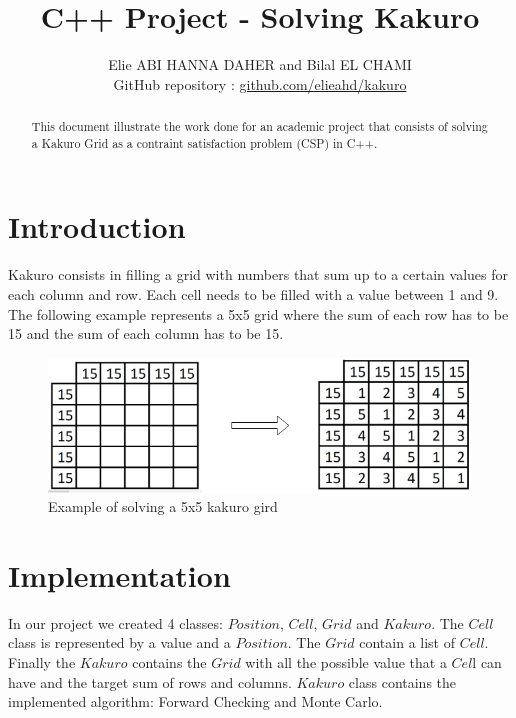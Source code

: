 \documentclass[journal, a4paper]{IEEEtran}
\begin{document}
\title{C++ Project - Solving Kakuro}
\author{
	Elie ABI HANNA DAHER and Bilal EL CHAMI \\ 
	GitHub repository : \href{https://github.com/elieahd/kakuro}{github.com/elieahd/kakuro}
}
\maketitle

\begin{abstract}
	This document illustrate the work done for an academic project that consists of solving a Kakuro Grid as a contraint satisfaction problem (CSP) in C++.
\end{abstract}

\section{Introduction}
 Kakuro consists in filling a grid with numbers that sum up to a certain values for each column and row. Each cell needs to be filled with a value between 1 and 9.\\
 The following example represents a 5x5 grid where the sum of each row has to be 15 and the sum of each column has to be 15.
\begin{figure}[h!]
    	 \begin{center}
		\includegraphics[width=\columnwidth]{example_kakuro.png}
  		\caption{Example of solving a 5x5 kakuro gird}
		\label{fig:example_kakuro}
    	 \end{center}
\end{figure}

\section{Implementation}
In our project we created 4 classes: $Position$, $Cell$, $Grid$ and $Kakuro$. The $Cell$ class is represented by a value and a $Position$. The $Grid$ contain a list of $Cell$. Finally the $Kakuro$ contains the $Grid$ with all the possible value that a $Cel$l can have and the target sum of rows and columns. $Kakuro$ class contains the implemented algorithm: Forward Checking and Monte Carlo. \\
\end{document}
